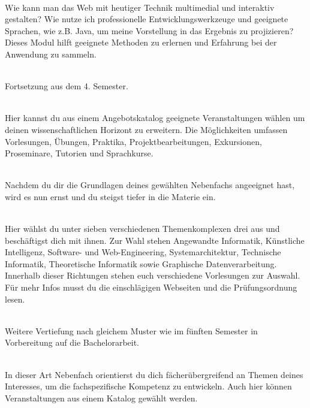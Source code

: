 \textbf{} \\
Wie kann man das Web mit heutiger Technik multimedial und interaktiv gestalten?
Wie nutze ich professionelle Entwicklungswerkzeuge und geeignete Sprachen, wie z.B. Java, um meine Vorstellung in das Ergebnis zu projizieren?
Dieses Modul hilft geeignete Methoden zu erlernen und Erfahrung bei der Anwendung zu sammeln.

\textbf{} \\
Fortsetzung aus dem 4. Semester.

\textbf{} \\
Hier kannst du aus einem Angebotskatalog geeignete Veranstaltungen wählen um deinen wissenschaftlichen Horizont zu erweitern.
Die Möglichkeiten umfassen Vorlesungen, Übungen, Praktika, Projektbearbeitungen, Exkursionen, Proseminare, Tutorien und Sprachkurse.

\textbf{} \\
Nachdem du dir die Grundlagen deines gewählten Nebenfachs angeeignet hast, wird es nun ernst und du steigst tiefer in die Materie ein.

\textbf{} \\
Hier wählst du unter sieben verschiedenen Themenkomplexen drei aus und beschäftigst dich mit ihnen.
Zur Wahl stehen Angewandte Informatik, Künstliche Intelligenz, Software- und Web-Engineering, Systemarchitektur, Technische Informatik, Theoretische Informatik sowie Graphische Datenverarbeitung.
Innerhalb dieser Richtungen stehen euch verschiedene Vorlesungen zur Auswahl.
Für mehr Infos musst du die einschlägigen Webseiten und die Prüfungsordnung lesen.



\textbf{} \\
Weitere Vertiefung nach gleichem Muster wie im fünften Semester in Vorbereitung auf die Bachelorarbeit.

\textbf{} \\
In dieser Art Nebenfach orientierst du dich fächerübergreifend an Themen deines Interesses, um die fachspezifische Kompetenz zu entwickeln.
Auch hier können Veranstaltungen aus einem Katalog gewählt werden.

